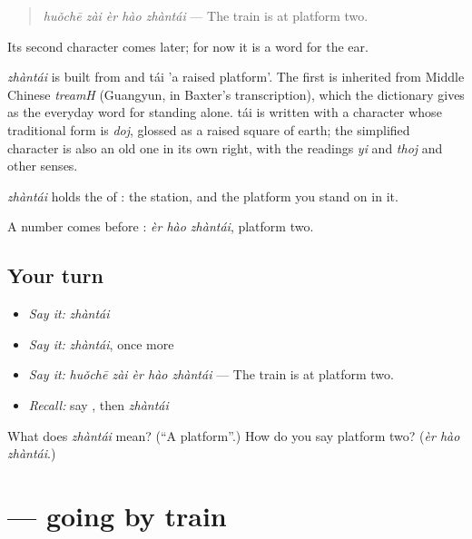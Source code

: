 \begin{quote}
\emph{huǒchē zài èr hào zhàntái} — The train is at platform two.
\end{quote}

Its second character comes later; for now it is a word for the ear.

\begin{cousinweb}
\emph{zhàntái} is built from  and tái 'a raised platform'. The first is inherited from Middle Chinese \emph{treamH} (Guangyun, in Baxter's transcription), which the dictionary gives as the everyday word for standing alone. tái is written with a character whose traditional form is \emph{doj}, glossed as a raised square of earth; the simplified character is also an old one in its own right, with the readings \emph{yi} and \emph{thoj} and other senses.
\end{cousinweb}

\begin{grammarlens}[title={What you've built}]
\emph{zhàntái} holds the  of : the station, and the platform you stand on in it.

A number comes before : \emph{èr hào zhàntái}, platform two.
\end{grammarlens}

\subsection*{Your turn}
\begin{itemize}
\raggedright
  \item \emph{Say it:} \emph{zhàntái}
  \item \emph{Say it:} \emph{zhàntái}, once more
  \item \emph{Say it:} \emph{huǒchē zài èr hào zhàntái} — The train is at platform two.
  \item \emph{Recall:} say , then \emph{zhàntái}
\end{itemize}

\begin{tcolorbox}[breakable,colback=teal!4,colframe=teal!35!black,title={Before you move on}]
What does \emph{zhàntái} mean? (\textquotedblleft{}A platform\textquotedblright{}.) How do you say platform two? (\emph{èr hào zhàntái}.)
\end{tcolorbox}
\section[\texorpdfstring{\zh{坐火车去} (zuò huǒchē qù)}{坐火车去 (zuò huǒchē qù)}]{ — going by train}


